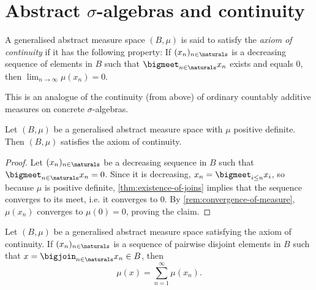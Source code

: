 \documentclass[article, a4paper, 11pt, oneside]{memoir}
\numberwithin{equation}{chapter}
\begin{document}
\section[Abstract sigma-algebras and continuity][Abstract $\sigma$-algebras and continuity]{Abstract $\sigma$-algebras and continuity}

\begin{definition}
    A generalised abstract measure space $(B, \mu)$ is said to satisfy the \emph{axiom of continuity} if it has the following property: If $(x_n)_{n\in\naturals}$ is a decreasing sequence of elements in $B$ such that $\bigmeet_{n\in\naturals} x_n$ exists and equals $0$, then $\lim_{n\to\infty} \mu(x_n) = 0$.
\end{definition}
%
This is an analogue of the continuity (from above) of ordinary countably additive measures on concrete $\sigma$-algebras.


\begin{lemma}
    \label{thm:positive-definite-implies-continuous}
    Let $(B, \mu)$ be a generalised abstract measure space with $\mu$ positive definite. Then $(B,\mu)$ satisfies the axiom of continuity.
\end{lemma}

\begin{proof}
    Let $(x_n)_{n\in\naturals}$ be a decreasing sequence in $B$ such that $\bigmeet_{n\in\naturals} x_n = 0$. Since it is decreasing, $x_n = \bigmeet_{i \leq n} x_i$, so because $\mu$ is positive definite, \cref{thm:existence-of-joins} implies that the sequence converges to its meet, i.e. it converges to $0$. By \cref{rem:convergence-of-measure}, $\mu(x_n)$ converges to $\mu(0) = 0$, proving the claim.
\end{proof}


\begin{proposition}
    \label{thm:generalised-addition}
    Let $(B, \mu)$ be a generalised abstract measure space satisfying the axiom of continuity. If $(x_n)_{n\in\naturals}$ is a sequence of pairwise disjoint elements in $B$ such that $x = \bigjoin_{n\in\naturals} x_n \in B$, then
    \begin{equation*}
        \mu(x)
            = \sum_{n=1}^\infty \mu(x_n).
    \end{equation*}
\end{proposition}
\end{document}
